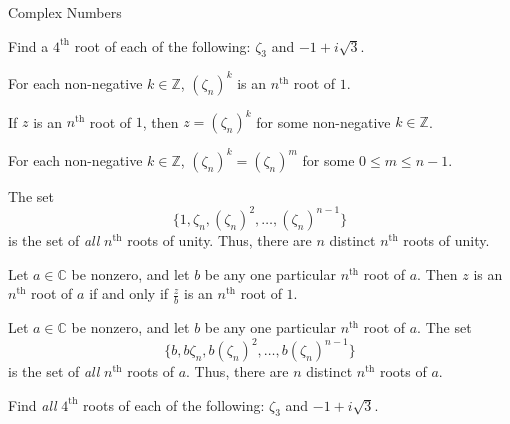 \begin{section}{Complex Numbers}
\begin{problem}\label{prob.nthRoots}
Find a $4^\text{th}$ root of each of the following: $\zeta_3$ and $-1 + i\sqrt{3}$.
\end{problem}

\begin{theorem}
For each non-negative $k\in \mathbb{Z}$, $(\zeta_n)^k$ is an $n^\text{th}$ root of $1$.
\end{theorem}

\begin{lemma}\label{lem.nthRoot1IsPowerOfZeta}
If $z$ is an $n^\text{th}$ root of $1$, then $z = (\zeta_n)^k$ for some non-negative $k\in \mathbb{Z}$.
\end{lemma}

\begin{lemma}\label{lem.ReducePowerOfZeta}
For each non-negative $k\in \mathbb{Z}$, $(\zeta_n)^k = (\zeta_n)^m$ for some $0\le m \le n-1$.
\end{lemma}

\begin{theorem}\label{thm.nthRoots1}
The set \[\{1, \zeta_n, (\zeta_n)^2, \ldots, (\zeta_n)^{n-1}\}\] is the set of \emph{all} $n^\text{th}$ roots of unity. Thus, there are $n$ distinct $n^\text{th}$ roots of unity. 
\end{theorem}

\begin{lemma}
Let $a\in \mathbb{C}$ be nonzero, and let $b$ be any one particular $n^\text{th}$ root of $a$. Then $z$ is an $n^\text{th}$ root of $a$ if and only if $\frac{z}{b}$ is an $n^\text{th}$ root of $1$.
\end{lemma}

\begin{theorem}\label{thm.nthRoots}
Let $a\in \mathbb{C}$ be nonzero, and let $b$ be any one particular $n^\text{th}$ root of $a$. The set \[\{b, b\zeta_n, b(\zeta_n)^2, \ldots, b(\zeta_n)^{n-1}\}\] is the set of \emph{all} $n^\text{th}$ roots of $a$. Thus, there are $n$ distinct $n^\text{th}$ roots of $a$. 
\end{theorem}

\begin{problem}
Find \emph{all} $4^\text{th}$ roots of each of the following: $\zeta_3$ and $-1 + i\sqrt{3}$.
\end{problem}


\end{section}
